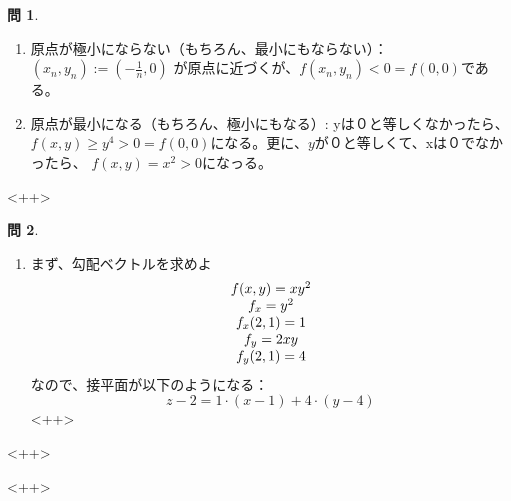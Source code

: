 \documentclass[12pt]{article} %
\theoremstyle{definition}
\newtheorem{question}{問}
\begin{document}
\begin{question}
	\begin{enumerate}[(1)]
		\item 原点が極小にならない（もちろん、最小にもならない）：
			$(x_n,y_n):=\left( -\frac{1}{n},0 \right)$ が原点に近づくが、$f(x_n,y_n)<0=f(0,0)$である。
		\item 原点が最小になる（もちろん、極小にもなる）:
			yは０と等しくなかったら、$f(x,y)\ge y^4>0=f(0,0)$になる。更に、$y$が０と等しくて、xは０でなかったら、
			$f(x,y)=x^2>0$になっる。
	\end{enumerate}
\end{question}<++>
\begin{question}
	\begin{enumerate}[(1)]
		\item まず、勾配ベクトルを求めよ
			\begin{equation*}
				\begin{array}[]{c}
					f(x,y)=xy^2\\
					f_x=y^2\\f_x(2,1)=1\\
					f_y=2xy\\f_y(2,1)=4
				\end{array}
			\end{equation*}
				なので、接平面が以下のようになる：\begin{equation*}
					z-2=1\cdot(x-1)+4\cdot(y-4)
				\end{equation*}<++>
	\end{enumerate}<++>
\end{question}<++>
\end{document}
